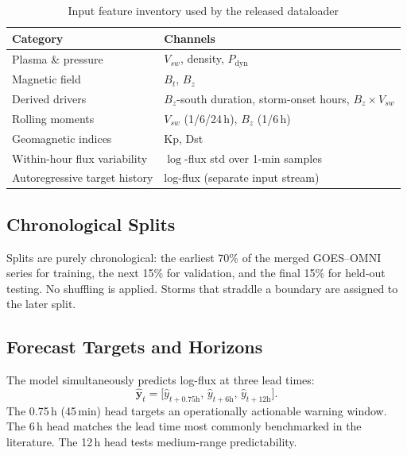 ﻿\documentclass{ieeeaccess}
\begin{document}
\begin{table}[h]
\centering
\caption{Input feature inventory used by the released dataloader}
\label{tab:features}
\begin{tabular}{@{}ll@{}}
\toprule
\textbf{Category} & \textbf{Channels} \\ \midrule
Plasma \& pressure & \(V_{sw}\), density, \(P_{\mathrm{dyn}}\) \\
Magnetic field & \(B_t\), \(B_z\) \\
Derived drivers & \(B_z\)-south duration, storm-onset hours, \(B_z\times V_{sw}\) \\
Rolling moments & \(V_{sw}\) (1/6/24\,h), \(B_z\) (1/6\,h) \\
Geomagnetic indices & Kp, Dst \\
Within-hour flux variability & \(\log\)-flux std over 1-min samples \\
Autoregressive target history & log-flux (separate input stream) \\ \bottomrule
\end{tabular}
\end{table}

\subsection{Chronological Splits}
Splits are purely chronological: the earliest 70\% of the merged GOES--OMNI series
for training, the next 15\% for validation, and the final 15\% for held-out
testing. No shuffling is applied. Storms that straddle a boundary are assigned
to the later split.

\subsection{Forecast Targets and Horizons}
The model simultaneously predicts log-flux at three lead times:
\begin{equation}
\hat{\mathbf{y}}_{t}
=
\bigl[\hat{y}_{t+0.75\mathrm{h}},\,
\hat{y}_{t+6\mathrm{h}},\,
\hat{y}_{t+12\mathrm{h}}\bigr].
\label{eq:horizons}
\end{equation}
The 0.75\,h (45\,min) head targets an operationally actionable warning window.
The 6\,h head matches the lead time most commonly benchmarked in the literature.
The 12\,h head tests medium-range predictability.
\end{document}
